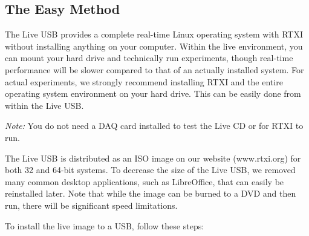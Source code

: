 
\subsection{The Easy Method}
\label{easyinstall}

The Live USB provides a complete real-time Linux operating system with RTXI without installing anything on your computer. Within the live environment, you can mount your hard drive and technically run experiments, though real-time performance will be slower compared to that of an actually installed system. For actual experiments, we strongly recommend installing RTXI and the entire operating system environment on your hard drive. This can be easily done from within the Live USB. 

\textit{Note:} You do not need a DAQ card installed to test the Live CD or for RTXI to run.

The Live USB is distributed as an ISO image on our website (www.rtxi.org) for both 32 and 64-bit systems. To decrease the size of the Live USB, we removed many  common desktop applications, such as LibreOffice, that can easily be reinstalled later. Note that while the image can be burned to a DVD and then run, there will be significant speed limitations. 

To install the live image to a USB, follow these steps:

